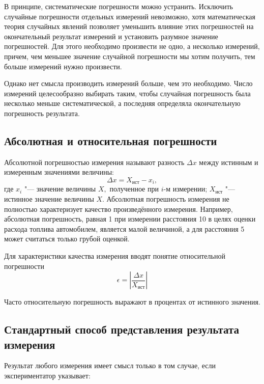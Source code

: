 \documentclass[a4paper, 12pt]{extarticle}
\newcommand{\eps}{\epsilon}
\begin{document}
В принципе, систематические погрешности можно устранить. Исключить случайные погрешности отдельных измерений невозможно, хотя математическая теория случайных явлений позволяет уменьшить влияние этих погрешностей на окончательный результат измерений и установить разумное значение погрешностей. Для этого необходимо произвести не одно, а несколько измерений, причем, чем меньшее значение случайной погрешности мы хотим получить, тем больше измерений нужно произвести.

Однако нет смысла производить измерений больше, чем это необходимо. Число измерений целесообразно выбирать таким, чтобы случайная погрешность была несколько меньше систематической, а последняя определяла окончательную погрешность результата.

\subsection {Абсолютная и относительная погрешности}
Абсолютной погрешностью измерения называют разность $\Delta x$ между
истинным и измеренным значениями величины:
\begin{equation}
\label{eq:abs-error}
\Delta x = X_{\text{ист}} - x_i,
\end{equation}
где $x_i$ "--- значение величины $X,$ полученное при $i$-м измерении; $X_{\text{ист}}$ "--- истинное значение величины $X.$
Абсолютная погрешность измерения не полностью характеризует
качество произведённого измерения. Например, абсолютная погрешность, равная 1  %
при измерении расстояния 10  в целях оценки расхода топлива автомобилем, является малой величиной, а для расстояния 5  может
считаться только грубой оценкой.

Для характеристики качества измерения вводят понятие относительной погрешности
\begin{equation}
\label{eq:rel-error}
\eps = \left| \frac{\Delta x}{X_{\text{ист}}}\right|
\end{equation}

Часто относительную погрешность выражают в процентах от истинного значения.

\subsection{Стандартный способ представления результата измерения}

Результат любого измерения имеет смысл только в том случае, если экспериментатор указывает:
\end{document}
